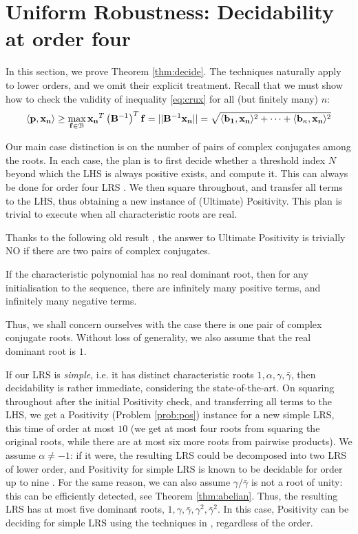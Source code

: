 \section{Uniform Robustness: Decidability at order four}
\label{section:decidability}
In this section, we prove Theorem \ref{thm:decide}. The techniques naturally apply to lower orders, and we omit their explicit treatment. Recall that we must show how to check the validity of inequality \ref{eq:crux} for all (but finitely many) $n$:
$$
\langle\mathbf{p}, \mathbf{x_n}\rangle \ge \max_{\mathbf{f} \in \mathcal{B}}\mathbf{x_n}^T\left(\mathbf{B}^{-1}\right)^T\mathbf{f} = ||\mathbf{B}^{-1}\mathbf{x_n}|| = \sqrt{\langle\mathbf{b_1}, \mathbf{x_n}\rangle^2 +\dots+\langle\mathbf{b_\kappa}, \mathbf{x_n}\rangle^2}
$$

Our main case distinction is on the number of pairs of complex conjugates among the roots. In each case, the plan is to first decide whether a threshold index $N$ beyond which the LHS is always positive exists, and compute it. This can always be done for order four LRS \cite{joeljames3}. We then square throughout, and transfer all terms to the LHS, thus obtaining a new instance of (Ultimate) Positivity. This plan is trivial to execute when all characteristic roots are real.

Thanks to the following old result \cite[Thm. 2]{positive-dominant}, the answer to Ultimate Positivity is trivially NO if there are two pairs of complex conjugates.

\begin{proposition}[Folklore]
\label{prop:folklore}
If the characteristic polynomial has no real dominant root, then for any initialisation to the sequence, there are infinitely many positive terms, and infinitely many negative terms.
\end{proposition}

Thus, we shall concern ourselves with the case there is one pair of complex conjugate roots. Without loss of generality, we also assume that the real dominant root is $1$. 

If our LRS is \textit{simple}, i.e. it has distinct characteristic roots $1, \alpha, \gamma, \bar{\gamma}$, then decidability is rather immediate, considering the state-of-the-art. On squaring throughout after the initial Positivity check, and transferring all terms to the LHS, we get a Positivity (Problem \ref{prob:pos}) instance for a new simple LRS, this time of order at most $10$ (we get at most four roots from squaring the original roots, while there are at most six more roots from pairwise products). We assume $\alpha \ne -1$: if it were, the resulting LRS could be decomposed into two LRS of lower order, and Positivity for simple LRS is known to be decidable for order up to nine \cite{ouaknine2014positivity}. For the same reason, we can also assume $\gamma/\bar{\gamma}$ is not a root of unity: this can be efficiently detected, see Theorem \ref{thm:abelian}. Thus, the resulting LRS has at most five dominant roots, $1, \gamma, \bar{\gamma}, \gamma^2, \bar{\gamma}^2$. In this case, Positivity can be deciding for simple LRS using the techniques in \cite{ouaknine2014positivity}, regardless of the order.

